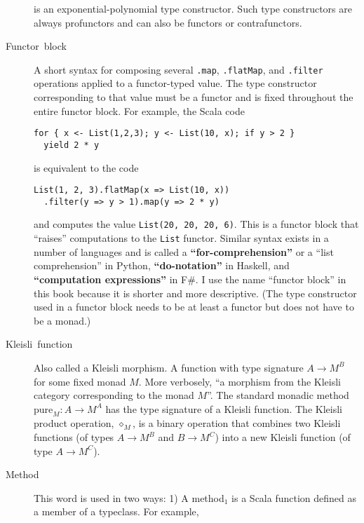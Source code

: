\begin{description}
is an exponential-polynomial type constructor. Such type constructors
are always profunctors and can also be functors or contrafunctors.
\item [{\index{functor block}Functor~block}] A short syntax for composing
several \lstinline!.map!, \lstinline!.flatMap!, and \lstinline!.filter!
operations applied to a functor-typed value. The type constructor
corresponding to that value must be a functor and is fixed throughout
the entire functor block. For example, the Scala code
\begin{lstlisting}
for { x <- List(1,2,3); y <- List(10, x); if y > 2 }
  yield 2 * y
\end{lstlisting}
is equivalent to the code
\begin{lstlisting}
List(1, 2, 3).flatMap(x => List(10, x))
  .filter(y => y > 1).map(y => 2 * y)
\end{lstlisting}
and computes the value \lstinline!List(20, 20, 20, 6)!. This is a
functor block that \textsf{``}raises\textsf{''} computations to the \lstinline!List!
functor. Similar syntax exists in a number of languages and is called
a \textbf{\textsf{``}for-comprehension\textsf{''}}
or a \textsf{``}list comprehension\textsf{''} in Python, \textbf{\textsf{``}do-notation\textsf{''}}
in Haskell, and \textbf{\textsf{``}computation expressions\textsf{''}}
in F\#. I use the name \textsf{``}functor block\textsf{''} in this book because it
is shorter and more descriptive. (The type constructor used in a functor
block needs to be at least a functor but does not have to be a monad.)
\item [{Kleisli~function}] Also called a Kleisli
morphism. A function with type signature
$A\rightarrow M^{B}$ for some fixed monad $M$. More verbosely, \textsf{``}a
morphism from the Kleisli category corresponding to the monad $M$\textsf{''}.
The standard monadic method $\text{pure}_{M}:A\rightarrow M^{A}$
has the type signature of a Kleisli function. The Kleisli product
operation, $\diamond_{M}$, is a binary operation that combines two
Kleisli functions (of types $A\rightarrow M^{B}$ and $B\rightarrow M^{C}$)
into a new Kleisli function (of type $A\rightarrow M^{C}$).
\item [{\index{method}Method}] This word is used in two ways: 1) A method$_{1}$
is a Scala function defined as a member of a typeclass. For example,

\end{description}

